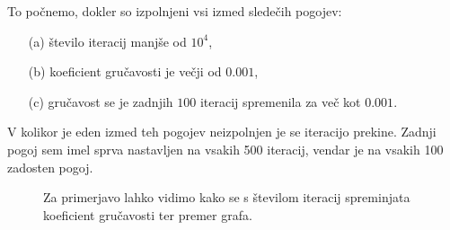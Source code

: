 \documentclass[12pt, a4paper]{article}
\begin{document}
To po\v cnemo, dokler so izpolnjeni vsi izmed slede\v cih pogojev:
\begin{itemize}
	\item[(a)]{\v stevilo iteracij manj\v se od $10^4$,}
	\item[(b)]{koeficient gru\v cavosti je ve\v cji od $0.001$,}
	\item[(c)]{gru\v cavost se je zadnjih $100$ iteracij spremenila za ve\v c kot $0.001$.}
\end{itemize}

V kolikor je eden izmed teh pogojev neizpolnjen je se iteracijo prekine. Zadnji pogoj sem imel sprva nastavljen na
vsakih 500 iteracij, vendar je na vsakih 100 zadosten pogoj.

\begin{figure}[H]\centering
	
	\caption{Za primerjavo lahko vidimo kako se s \v stevilom iteracij spreminjata koeficient gru\v cavosti
		ter premer grafa.}
\end{figure}
\end{document}
